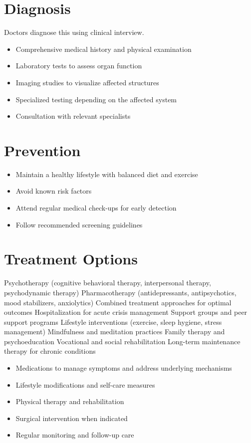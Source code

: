 \section{Diagnosis}
Doctors diagnose this using clinical interview.

\begin{itemize}[noitemsep]
  \item Comprehensive medical history and physical examination
  \item Laboratory tests to assess organ function
  \item Imaging studies to visualize affected structures
  \item Specialized testing depending on the affected system
  \item Consultation with relevant specialists
\end{itemize}
\section{Prevention}
\begin{itemize}[noitemsep]
  \item Maintain a healthy lifestyle with balanced diet and exercise
  \item Avoid known risk factors
  \item Attend regular medical check-ups for early detection
  \item Follow recommended screening guidelines
\end{itemize}
\section{Treatment Options}
Psychotherapy (cognitive behavioral therapy, interpersonal therapy, psychodynamic therapy) Pharmacotherapy (antidepressants, antipsychotics, mood stabilizers, anxiolytics) Combined treatment approaches for optimal outcomes Hospitalization for acute crisis management Support groups and peer support programs Lifestyle interventions (exercise, sleep hygiene, stress management) Mindfulness and meditation practices Family therapy and psychoeducation Vocational and social rehabilitation Long-term maintenance therapy for chronic conditions

\begin{itemize}[noitemsep]
  \item Medications to manage symptoms and address underlying mechanisms
  \item Lifestyle modifications and self-care measures
  \item Physical therapy and rehabilitation
  \item Surgical intervention when indicated
  \item Regular monitoring and follow-up care
\end{itemize}
